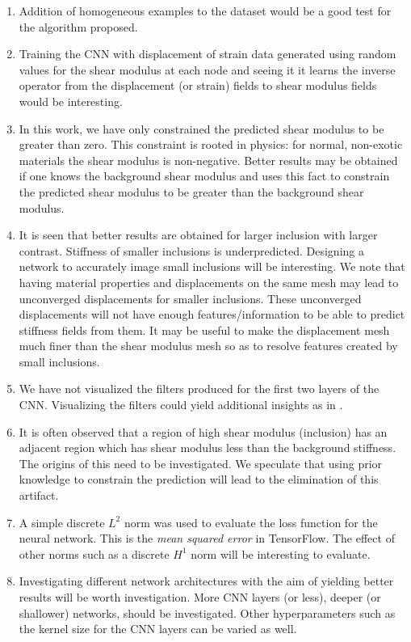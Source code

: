 \documentclass[12pt]{article}
\begin{document}
\begin{enumerate}
\item{Addition of homogeneous examples to the dataset would be a good test for the algorithm proposed.}
\item{Training the CNN with displacement of strain data generated using random values for the shear modulus at each node and seeing it it learns the inverse operator from the displacement (or strain) fields to shear modulus fields would be interesting. }
\item{In this work, we have only constrained the predicted shear modulus to be greater than zero. This constraint is rooted in physics: for normal, non-exotic materials the shear modulus is non-negative. Better results may be obtained if one knows the background shear modulus and uses this fact to constrain the predicted shear modulus to be greater than the background shear modulus.}
\item{It is seen that better results are obtained for larger inclusion with larger contrast. Stiffness of smaller inclusions is underpredicted. Designing a network to accurately image small inclusions will be interesting. We note that having material properties and displacements on the same mesh may lead to unconverged displacements for smaller inclusions. These unconverged displacements will not have enough features/information to be able to predict stiffness fields from them. It may be useful to make the displacement mesh much finer than the shear modulus mesh so as to resolve features created by small inclusions.}
\item{We have not visualized the filters produced for the first two layers of the CNN. Visualizing the filters could yield additional insights as in \cite{paper:pateloberai2019}.}
\item{It is often observed that a region of high shear modulus (inclusion) has an adjacent region which has shear modulus less than the background stiffness. The origins of this need to be investigated. We speculate that using prior knowledge to constrain the prediction will lead to the elimination of this artifact.}
\item{A simple discrete $L^2$ norm was used to evaluate the loss function for the neural network. This is the \textit{mean squared error} in TensorFlow. The effect of other norms such as a discrete $H^1$ norm will be interesting to evaluate.}
\item{Investigating different network architectures with the aim of yielding better results will be worth investigation. More CNN layers (or less), deeper (or shallower) networks, should be investigated. Other hyperparameters such as the kernel size for the CNN layers can be varied as well.}

\end{enumerate}
\end{document}
